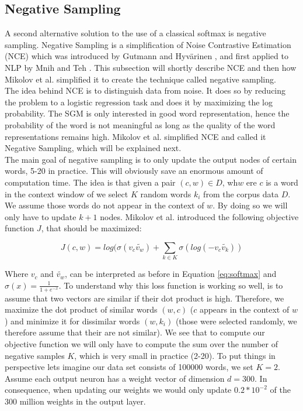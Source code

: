 \subsection{Negative Sampling}
A second alternative solution to the use of a classical softmax is negative sampling. Negative Sampling is a simplification of Noise Contrastive Estimation (NCE) which was introduced by Gutmann and Hyv{\"a}rinen \cite{nce-original}, and first applied to NLP by Mnih and Teh \cite{mnih}. This subsection will shortly describe NCE and then how Mikolov et al. \cite{mikolov2} simplified it to create the technique called negative sampling. \\ The idea behind NCE is to distinguish data from noise. It does so by reducing the problem to a logistic regression task and does it by maximizing the log probability. The SGM is only interested in good word representation, hence the probability of the word is not meaningful as long as the quality of the word representations remains high. Mikolov et al. \cite{mikolov2} simplified NCE and called it Negative Sampling, which will be explained next.\\
The main goal of negative sampling is to only update the output nodes of certain words, 5-20 in practice. This will obviously save an enormous amount of computation time. The idea is that given a pair $(c,w) \in D$, wh$w$ ere $c$ is a word in the context window of we select $K$ random words $k_i$ from the corpus data $D$. We assume those words do not appear in the context of $w$. By doing so we will only have to update $k+1$ nodes. Mikolov et al. \cite{mikolov2} introduced the following objective function $J$, that should be maximized:

\begin{equation}
J(c,w)= log(\sigma(v_c \tilde{v_w } ) + \sum_{k\in K} \sigma(log(-v_c \tilde{v_k} ))
\end{equation}\label{eq:obj_neg_samples}

Where $v_c$ and $\tilde{v_w }$, can be interpreted as before in Equation \ref{eq:softmax} and $\sigma(x) = \frac{1}{1+e^{-x}}$. To  understand why this loss function is working so well, is to assume that two vectors are similar if their dot product is high. Therefore, we maximize the dot product of similar words $(w,c)$ ($c$ appears in the context of $w$) and minimize it for dissimilar words $(w,k_i)$ (those were selected randomly, we therefore assume that their are not similar).
We see that to compute our objective function we will only have to compute the sum over the number of negative samples $K$, which is very small in practice (2-20). To put things in perspective lets imagine our data set consists of 100000 words, we set $K=2$. Assume each output neuron has a weight vector of dimension $d = 300$. In consequence, when updating our weights we would only update $0.2*10^{-2}$ of the 300 million weights in the output layer.

